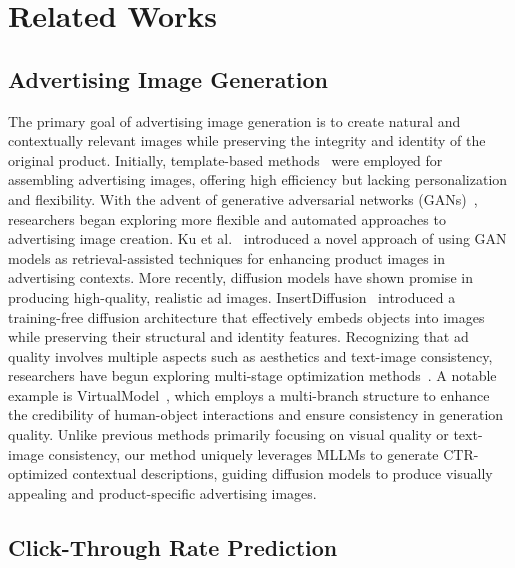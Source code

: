 \section{Related Works}
\subsection{Advertising Image Generation}

The primary goal of advertising image generation is to create natural and contextually relevant images while preserving the integrity and identity of the original product. Initially, template-based methods~\cite{wei2022towards,chen2103automated,wei2022towards,mishra2020learning} were employed for assembling advertising images, offering high efficiency but lacking personalization and flexibility.
With the advent of generative adversarial networks (GANs)~\cite{goodfellow2020generative}, researchers began exploring more flexible and automated approaches to advertising image creation. Ku et al.~\cite{ku2023staging} introduced a novel approach of using GAN models as retrieval-assisted techniques for enhancing product images in advertising contexts.
%
More recently, diffusion models have shown promise in producing high-quality, realistic ad images. InsertDiffusion~\cite{mueller2024insertdiffusion} introduced a training-free diffusion architecture that effectively embeds objects into images while preserving their structural and identity features. 
%
Recognizing that ad quality involves multiple aspects such as aesthetics and text-image consistency, researchers have begun exploring multi-stage optimization methods~\cite{li2023planning,chen2024virtualmodel,lee2024parrot}. A notable example is VirtualModel~\cite{chen2024virtualmodel}, which employs a multi-branch structure to enhance the credibility of human-object interactions and ensure consistency in generation quality. 
Unlike previous methods primarily focusing on visual quality or text-image consistency, our method uniquely leverages MLLMs to generate CTR-optimized contextual descriptions, guiding diffusion models to produce visually appealing and product-specific advertising images.


\subsection{Click-Through Rate Prediction}

